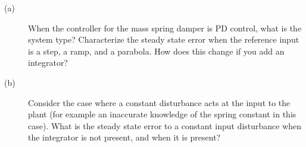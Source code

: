 \begin{description}
\item[(a)] When the controller for the mass spring damper is PD control, what is the system type?  Characterize the steady state error when the reference input is a step, a ramp, and a parabola.  How does this change if you add an integrator?
\item[(b)] Consider the case where a constant disturbance acts at the input to the plant (for example an inaccurate knowledge of the spring constant in this case).  What is the steady state error to a constant input disturbance when the integrator is not present, and when it is present?
\end{description}
